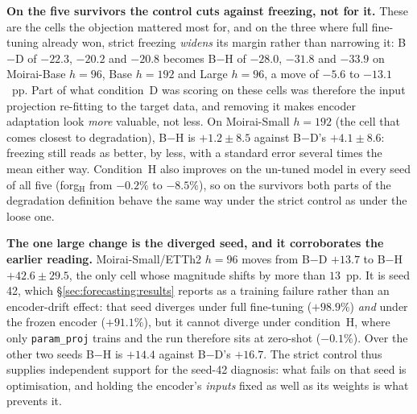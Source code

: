 \textbf{On the five survivors the control cuts against freezing, not for it.}
These are the cells the objection mattered most for, and on the three where full
fine-tuning already won, strict freezing \emph{widens} its margin rather than
narrowing it: B$-$D of $-22.3$, $-20.2$ and $-20.8$ becomes B$-$H of $-28.0$,
$-31.8$ and $-33.9$ on Moirai-Base $h{=}96$, Base $h{=}192$ and Large $h{=}96$,
a move of $-5.6$ to $-13.1$~pp. Part of what condition~D was scoring on these
cells was therefore the input projection re-fitting to the target data, and
removing it makes encoder adaptation look \emph{more} valuable, not less. On
Moirai-Small $h{=}192$ (the cell that comes closest to degradation), B$-$H is
$+1.2{\pm}8.5$ against B$-$D's $+4.1{\pm}8.6$: freezing still reads as better,
by less, with a standard error several times the mean either way. Condition~H
also improves on the un-tuned model in every seed of all five
(forg$_\text{H}$ from $-0.2\%$ to $-8.5\%$), so on the survivors both parts of
the degradation definition behave the same way under the strict control as
under the loose one.

\textbf{The one large change is the diverged seed, and it corroborates the
earlier reading.} Moirai-Small/ETTh2 $h{=}96$ moves from B$-$D $+13.7$ to
B$-$H $+42.6{\pm}29.5$, the only cell whose magnitude shifts by more than
$13$~pp. It is seed 42, which \S\ref{sec:forecasting:results} reports as a
training failure rather than an encoder-drift effect: that seed diverges under
full fine-tuning ($+98.9\%$) \emph{and} under the frozen encoder ($+91.1\%$),
but it cannot diverge under condition~H, where only \texttt{param\_proj} trains
and the run therefore sits at zero-shot ($-0.1\%$). Over the other two seeds
B$-$H is $+14.4$ against B$-$D's $+16.7$. The strict control thus supplies
independent support for the seed-42 diagnosis: what fails on that seed is
optimisation, and holding the encoder's \emph{inputs} fixed as well as its
weights is what prevents it.

\begin{table}[ht]
\centering
\caption{The strict-freeze control (condition~H) beside condition~D on sixteen
cells: the six that met the degradation definition under the superseded trend
baseline, plus ILI, plus the five gate-passing survivors of
\S\ref{sec:forecasting:results}, plus all four Moirai/ETTm2 value-cells.
\textbf{B$-$H keeps B$-$D's sign on twelve and reverses it on all four ETTm2
cells}, where condition~D's margin was the input projection re-fitting rather
than the encoder being held still. B$-$D is restricted to the seeds condition~H
ran, and a cell with fewer than three H seeds is excluded and named by the
emitter rather than printed thin. $n$ is shown on every row and is not constant
down the column; ILI's $452$ is its whole training split rather than a cap
(Table~\ref{tab:heldout_all}). Generated by
\texttt{scripts/cell\_matrix.py --latex}.}
\label{tab:strictfreeze}

\end{table}

